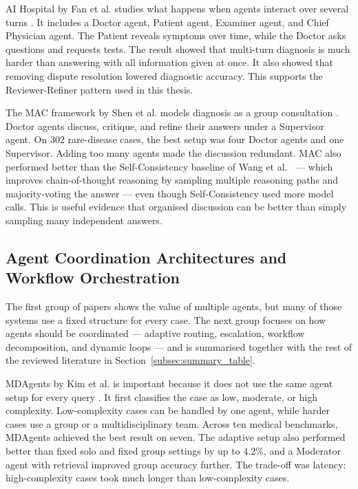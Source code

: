 AI Hospital by Fan et al. studies what happens when agents interact over several
turns \cite{Fan2024AIHospital}. It includes a Doctor agent, Patient agent,
Examiner agent, and Chief Physician agent. The Patient reveals symptoms over
time, while the Doctor asks questions and requests tests. The result showed that
multi-turn diagnosis is much harder than answering with all information given at
once. It also showed that removing dispute resolution lowered diagnostic
accuracy. This supports the Reviewer-Refiner pattern used in this thesis.

The MAC framework by Shen et al. models diagnosis as a group consultation
\cite{MAC2025npj}. Doctor agents discuss, critique, and refine their answers
under a Supervisor agent. On 302 rare-disease cases, the best setup was four
Doctor agents and one Supervisor. Adding too many agents made the discussion
redundant. MAC also performed better than the Self-Consistency baseline of
Wang et al.~\cite{Wang2023SelfConsistency} --- which improves chain-of-thought
reasoning by sampling multiple reasoning paths and majority-voting the answer
--- even though Self-Consistency used more model calls. This is useful
evidence that organised
discussion can be better than simply sampling many independent answers.

\FloatBarrier
\subsection{Agent Coordination Architectures and Workflow Orchestration}
\label{subsec:coordination}

The first group of papers shows the value of multiple agents, but
many of those systems use a fixed structure for every case. The next
group focuses on how agents should be coordinated --- adaptive
routing, escalation, workflow decomposition, and dynamic loops ---
and is summarised together with the rest of the reviewed literature
in Section~\ref{subsec:summary_table}.

MDAgents by Kim et al. is important because it does not use the same agent setup
for every query \cite{Kim2024MDAgents}. It first classifies the case as low,
moderate, or high complexity. Low-complexity cases can be handled by one agent,
while harder cases use a group or a multidisciplinary team. Across ten medical
benchmarks, MDAgents achieved the best result on seven. The adaptive setup also
performed better than fixed solo and fixed group settings by up to 4.2\%, and a
Moderator agent with retrieval improved group accuracy further. The trade-off was
latency: high-complexity cases took much longer than low-complexity cases.

